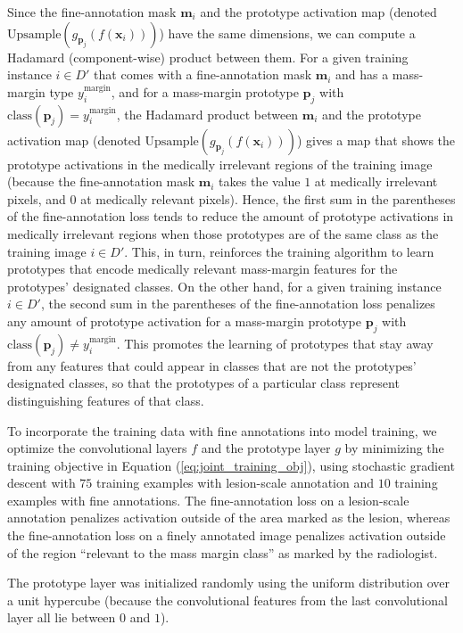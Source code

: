\documentclass[11pt]{article}
\begin{document}
Since the fine-annotation mask $\mathbf{m}_i$ and the prototype activation map (denoted $\textrm{Upsample}(g_{\mathbf{p}_j}(f(\mathbf{x}_i)))$) have the same dimensions, we can compute a Hadamard (component-wise) product between them. For a given training instance $i \in D'$ that comes with a fine-annotation mask $\mathbf{m}_i$ and has a mass-margin type $y^{\text{margin}}_i$, and for a mass-margin prototype $\mathbf{p}_j$ with $\text{class}(\mathbf{p}_j) = y^{\text{margin}}_i$, the Hadamard product between $\mathbf{m}_i$ and the prototype activation map (denoted $\textrm{Upsample}(g_{\mathbf{p}_j}(f(\mathbf{x}_i)))$) gives a map that shows the prototype activations in the medically irrelevant regions of the training image (because the fine-annotation mask $\mathbf{m}_i$ takes the value $1$ at medically irrelevant pixels, and $0$ at medically relevant pixels). Hence, the first sum in the parentheses of the fine-annotation loss tends to reduce the amount of prototype activations in medically irrelevant regions when those prototypes are of the same class as the training image $i \in D'$. This, in turn, reinforces the training algorithm to learn prototypes that encode medically relevant mass-margin features for the prototypes' designated classes. On the other hand, for a given training instance $i \in D'$, the second sum in the parentheses of the fine-annotation loss penalizes any amount of prototype activation for a mass-margin prototype $\mathbf{p}_j$ with $\text{class}(\mathbf{p}_j) \neq y^{\text{margin}}_i$. This promotes the learning of prototypes that stay away from any features that could appear in classes that are not the prototypes' designated classes, so that the prototypes of a particular class represent distinguishing features of that class.

To incorporate the training data with fine annotations into model training, we optimize the convolutional layers $f$ and the prototype layer $g$ by minimizing the training objective in Equation (\ref{eq:joint_training_obj}), using stochastic gradient descent with $75$ training examples with lesion-scale annotation and $10$ training examples with fine annotations. The fine-annotation loss on a lesion-scale annotation penalizes activation outside of the area marked as the lesion, whereas the fine-annotation loss on a finely annotated image penalizes activation outside of the region ``relevant to the mass margin class'' as marked by the radiologist. 

The prototype layer was initialized randomly using the uniform distribution over a unit hypercube (because the convolutional features from the last convolutional layer all lie between $0$ and $1$). 
\end{document}
